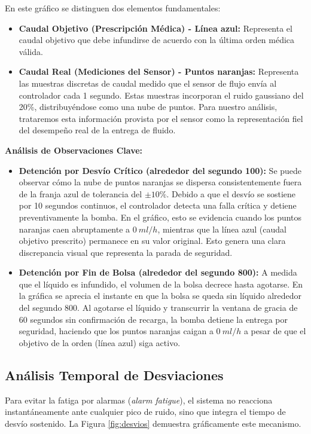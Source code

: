 En este gráfico se distinguen dos elementos fundamentales:
\begin{itemize}
    \item \textbf{Caudal Objetivo (Prescripción Médica) - Línea azul:} Representa el caudal objetivo que debe infundirse de acuerdo con la última orden médica válida.
    \item \textbf{Caudal Real (Mediciones del Sensor) - Puntos naranjas:} Representa las muestras discretas de caudal medido que el sensor de flujo envía al controlador cada 1 segundo. Estas muestras incorporan el ruido gaussiano del 20\%, distribuyéndose como una nube de puntos. Para nuestro análisis, trataremos esta información provista por el sensor como la representación fiel del desempeño real de la entrega de fluido.
\end{itemize}

\textbf{Análisis de Observaciones Clave:}
\begin{itemize}
    \item \textbf{Detención por Desvío Crítico (alrededor del segundo 100):} Se puede observar cómo la nube de puntos naranjas se dispersa consistentemente fuera de la franja azul de tolerancia del $\pm 10\%$. Debido a que el desvío se sostiene por 10 segundos continuos, el controlador detecta una falla crítica y detiene preventivamente la bomba. En el gráfico, esto se evidencia cuando los puntos naranjas caen abruptamente a $0~ml/h$, mientras que la línea azul (caudal objetivo prescrito) permanece en su valor original. Esto genera una clara discrepancia visual que representa la parada de seguridad.
    \item \textbf{Detención por Fin de Bolsa (alrededor del segundo 800):} A medida que el líquido es infundido, el volumen de la bolsa decrece hasta agotarse. En la gráfica se aprecia el instante en que la bolsa se queda sin líquido alrededor del segundo 800. Al agotarse el líquido y transcurrir la ventana de gracia de 60 segundos sin confirmación de recarga, la bomba detiene la entrega por seguridad, haciendo que los puntos naranjas caigan a $0~ml/h$ a pesar de que el objetivo de la orden (línea azul) siga activo.
\end{itemize}

\subsection{Análisis Temporal de Desviaciones}
Para evitar la fatiga por alarmas (\textit{alarm fatigue}), el sistema no reacciona instantáneamente ante cualquier pico de ruido, sino que integra el tiempo de desvío sostenido. La Figura \ref{fig:desvios} demuestra gráficamente este mecanismo.

